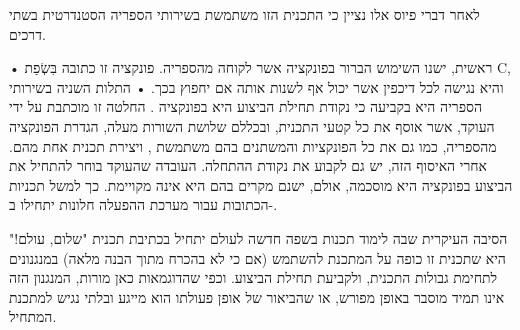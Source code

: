 לאחר דברי פיוס אלו נציין כי התכנית הזו משתמשת בשירותי הספריה הסטנדרטית בשתי דרכים.
\begin{itemize}
• ראשית, ישנו השימוש הברור בפונקציה  אשר לקוחה מהספריה. פונקציה זו כתובה בִּשְׂפַת C, והיא נגישה לכל דיכפין אשר יכול אף לשנות אותה אם יחפוץ בכך.
• התלות השניה בשירותי הספריה היא בקביעה כי נקודת תחילת הביצוע היא בפונקציה . החלטה זו מוכתבת על ידי העוקד, אשר אוסף את כל קטעי התכנית, ובכללם שלושת השורות מעלה, הגדרת הפונקציה  מהספריה, כמו גם את כל הפונקציות והמשתנים בהם משתמשת , ויצירת תכנית אחת מהם. אחרי האיסוף הזה, יש גם לקבוע את נקודת ההתחלה.
העובדה שהעוקד בוחר להתחיל את הביצוע בפונקציה  היא מוסכמה, אולם, ישנם מקרים בהם היא אינה מקויימת. כך למשל תכניות הכתובות עבור מערכת ההפעלה חלונות יתחילו ב-.
\end{itemize}

הסיבה העיקרית שבה לימוד תכנות בשפה חדשה לעולם יתחיל בכתיבת תכנית "שלום, עולם!" היא שתכנית זו כופה על המתכנת להשתמש (אם כי לא בהכרח מתוך הבנה מלאה) במנגנונים לתחימת גבולות התכנית, ולקביעת תחילת הביצוע. וכפי שהדוגמאות כאן מורות, המנגנון הזה אינו תמיד מוסבר באופן מפורש, או שהביאור של אופן פעולתו הוא מייגע ובלתי נגיש למתכנת המתחיל.

